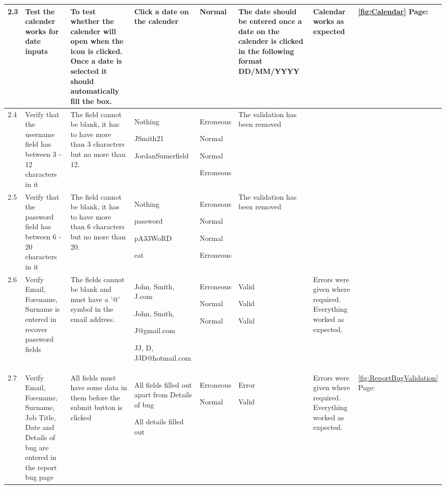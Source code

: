 \begin{landscape}
\begin{center}
\begin{longtable}{|p{1.5cm}|p{2cm}|p{2.5cm}|p{2cm}|p{2cm}|p{2cm}|p{3cm}|p{1.7cm}|}
2.3 & Test the calender works for date inputs & To test whether the calender will open when the icon is clicked. Once a date is selected it should automatically fill the box. & Click a date on the calender & Normal  & The date should be entered once a date on the calender is clicked in the following format DD/MM/YYYY &Calendar works as expected&  \ref {fig:Calendar} Page: \pageref{fig:Calendar}  \\ \hline
\rowcolor{gray}2.4 & Verify that the username field has between 3 - 12 characters in it & The field cannot be blank, it has to have more than 3 characters but no more than 12. & Nothing \par \bigskip 30597 \par \bigskip JSmith21 \par \bigskip JordanSumerfield &Erroneous \par \bigskip  Normal \par \bigskip Normal \par \bigskip Erroneous &The validation has been removed && \\ \hline
\rowcolor{gray}2.5 & Verify that the password field has between 6 - 20 characters in it & The field cannot be blank, it has to have more than 6 characters but no more than 20. & Nothing \par password \par pA33WoRD \par cat  &Erroneous \par Normal \par Normal \par Erroneous &The validation has been removed && \\ \hline
2.6 & Verify Email, Forename, Surname is entered in recover password fields & The fields cannot be blank and must have a '@' symbol in the email address. & John, Smith, J.com \par  \bigskip John, Smith, \par J@gmail.com \bigskip \par JJ, D, JJD@hotmail.com \par & Erroneous \par \bigskip Normal \par \bigskip \bigskip Normal &  \par Valid \par \bigskip Valid \par \bigskip \bigskip Valid&Errors were given where required. Everything worked as expected.& \\ \hline
2.7 & Verify Email, Forename, Surname, Job Title, Date and Details of bug are entered in the report bug page & All fields must have some data in them before the submit  button is clicked & All fields filled out apart from Details of bug \par \bigskip All details filled out & Erroneous \par \bigskip \bigskip Normal & Error \par\bigskip \bigskip Valid &Errors were given where required. Everything worked as expected.&\ref {fig:ReportBugValidation} Page: \pageref{fig:ReportBugValidation}\\ \hline

\end{longtable}
\end{center}
\end{landscape}
